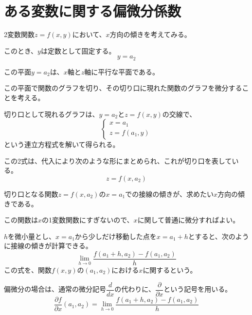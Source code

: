 \documentclass[../../../topic_multivariable-calculus]{subfiles}
\begin{document}
\sectionline
\section{ある変数に関する偏微分係数}

2変数関数$z = f(x, y)$において、$x$方向の傾きを考えてみる。

このとき、$y$は定数として固定する。
\begin{equation*}
  y = a_2
\end{equation*}

この平面$y=a_2$は、$x$軸と$z$軸に平行な平面である。

この平面で関数のグラフを切り、その切り口に現れた関数のグラフを微分することを考える。

\br

切り口として現れるグラフは、$y = a_2$と$z=f(x, y)$の交線で、
\begin{equation*}
  \begin{cases} 
    x = a_1 \\ 
    z = f(a_1, y) 
  \end{cases}
\end{equation*}
という連立方程式を解いて得られる。

\br

この2式は、代入により次のような形にまとめられ、これが切り口を表している。
\begin{equation*}
  z = f(x, a_2)
\end{equation*}

切り口となる関数$z = f(x, a_2)$の$x = a_1$での接線の傾きが、求めたい$x$方向の傾きである。

この関数は$x$の1変数関数にすぎないので、$x$に関して普通に微分すればよい。

\br

$h$を微小量とし、$x = a_1$から少しだけ移動した点を$x = a_1 + h$とすると、次のように接線の傾きが計算できる。
\begin{equation*}
  \lim_{h \to 0} \frac{f(a_1 + h, a_2) - f(a_1, a_2)}{h}
\end{equation*}
この式を、関数$f(x,y)$の$(a_1,a_2)$における$x$に関するという。

偏微分の場合は、通常の微分記号$\dfrac{d}{dx}$の代わりに、$\dfrac{\partial}{\partial x}$という記号を用いる。
\begin{equation*}
  \dfrac{\partial f}{\partial x}(a_1,a_2) = \lim_{h \to 0} \frac{f(a_1 + h, a_2) - f(a_1, a_2)}{h}
\end{equation*}
\end{document}
